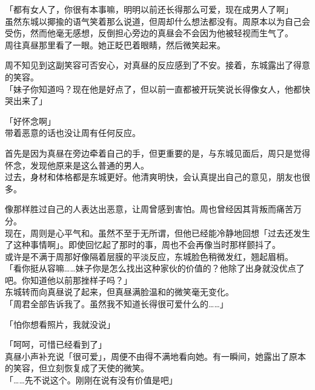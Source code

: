 「都有女人了，你很有本事嘛，明明以前还长得那么可爱，现在成男人了啊」\\

虽然东城以揶揄的语气笑着那么说道，但周却什么想法都没有。周原本以为自己会受伤，然而他毫无感想，反倒担心旁边的真昼会不会因为他被轻视而生气了。\\

周往真昼那里看了一眼。她正眨巴着眼睛，然后微笑起来。

周不知见到这副笑容可否安心，对真昼的反应感到了不安。接着，东城露出了得意的笑容。\\

「妹子你知道吗？现在他是好点了，但以前一直都被开玩笑说长得像女人，他都快哭出来了」

「好怀念啊」\\

带着恶意的话也没让周有任何反应。

首先是因为真昼在旁边牵着自己的手，但更重要的是，与东城见面后，周只是觉得怀念，发现他原来是这么普通的男人。\\

过去，身材和体格都是东城更好。他清爽明快，会认真提出自己的意见，朋友也很多。

像那样胜过自己的人表达出恶意，让周曾感到害怕。周也曾经因其背叛而痛苦万分。\\

现在，周则是心平气和。虽然不至于无所谓，但他已经能冷静地回想「过去还发生了这种事情啊」。即使回忆起了那时的事，周也不会再像当时那样颤抖了。\\

或许是不满于周那好像隔着层膜的平淡反应，东城脸色稍微发红，翘起眉梢。\\

「看你挺从容嘛……妹子你是怎么找出这种家伙的价值的？他除了出身就没优点了吧。你知道他以前那挫样子吗？」\\

东城转而向真昼说了起来，但真昼满脸温和的微笑毫无变化。\\

「周君全部告诉我了。虽然我不知道长得很可爱什么的……」

「怕你想看照片，我就没说」

「呵呵，可惜已经看到了」\\

真昼小声补充说「很可爱」，周便不由得不满地看向她。有一瞬间，她露出了原本的笑容，但立刻恢复成了天使的微笑。\\

「……先不说这个。刚刚在说有没有价值是吧」\\

